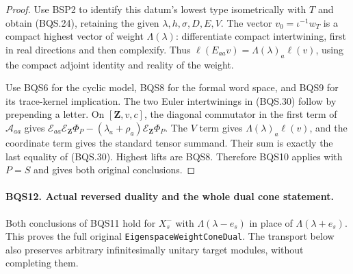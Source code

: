\begin{proof}
Use BSP2 to identify this datum's lowest type isometrically with $T$
and obtain (BQS.24), retaining the given $\lambda,h,\sigma,D,E,V$.
The vector $v_0=\iota^{-1}w_T$ is a compact highest vector of weight
$\Lambda(\lambda)$: differentiate compact intertwining, first in real
directions and then complexify.
Thus $\ell(E_{aa}v)=\Lambda(\lambda)_a\ell(v)$, using the
compact adjoint identity and reality of the weight.

Use BQS6 for the cyclic model, BQS8 for the formal word space, and
BQS9 for its trace-kernel implication.
The two Euler intertwinings in (BQS.30) follow by prepending a letter.
On $[\mathbf Z,v,c]$, the diagonal commutator in the first term of
$\mathcal A_{aa}$ gives
$\mathcal E_{aa}\mathcal E_{\mathbf Z}\Phi_P
 -(\lambda_a+\rho_a)\mathcal E_{\mathbf Z}\Phi_P$.
The $V$ term gives $\Lambda(\lambda)_a\ell(v)$, and the coordinate
term gives the standard tensor summand.
Their sum is exactly the last equality of (BQS.30).
Highest lifts are BQS8.  Therefore BQS10 applies with $P=S$ and
gives both original conclusions.
\end{proof}

\paragraph{BQS12. Actual reversed duality and the whole dual cone statement.}
\label{claim:BQS12}
Both conclusions of BQS11 hold for $X_s^-$ with
$\Lambda(\lambda-e_s)$ in place of $\Lambda(\lambda+e_s)$.
This proves the full original \texttt{EigenspaceWeightConeDual}.
The transport below also preserves arbitrary infinitesimally unitary
target modules, without completing them.


